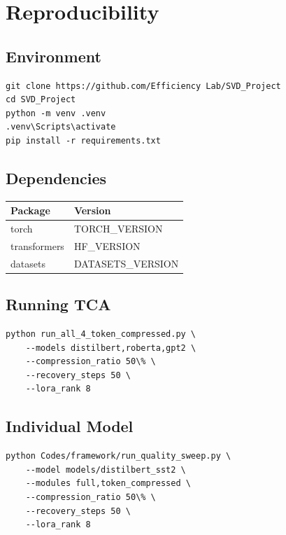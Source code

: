 \section{Reproducibility}

\subsection{Environment}

\begin{lstlisting}
git clone https://github.com/Efficiency Lab/SVD_Project
cd SVD_Project
python -m venv .venv
.venv\Scripts\activate
pip install -r requirements.txt
\end{lstlisting}

\subsection{Dependencies}

\begin{table}[H]
\centering
\small
\begin{tabular}{ll}
\toprule
\textbf{Package} & \textbf{Version} \\
\midrule
torch & {{TORCH\_VERSION}} \\
transformers & {{HF\_VERSION}} \\
datasets & {{DATASETS\_VERSION}} \\
\bottomrule
\end{tabular}
\end{table}

\subsection{Running TCA}

\begin{lstlisting}
python run_all_4_token_compressed.py \
    --models distilbert,roberta,gpt2 \
    --compression_ratio 50\% \
    --recovery_steps 50 \
    --lora_rank 8
\end{lstlisting}

\subsection{Individual Model}

\begin{lstlisting}
python Codes/framework/run_quality_sweep.py \
    --model models/distilbert_sst2 \
    --modules full,token_compressed \
    --compression_ratio 50\% \
    --recovery_steps 50 \
    --lora_rank 8
\end{lstlisting}

